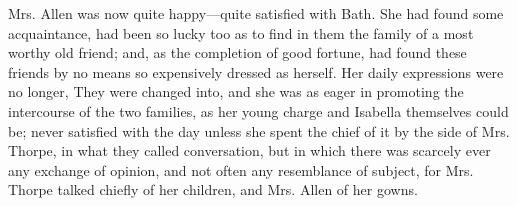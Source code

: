 Mrs. Allen was now quite happy---quite satisfied with Bath. She had found some acquaintance, had been so lucky too as to find in them the family of a most worthy old friend; and, as the completion of good fortune, had found these friends by no means so expensively dressed as herself. Her daily expressions were no longer,  They were changed into,  and she was as eager in promoting the intercourse of the two families, as her young charge and Isabella themselves could be; never satisfied with the day unless she spent the chief of it by the side of Mrs. Thorpe, in what they called conversation, but in which there was scarcely ever any exchange of opinion, and not often any resemblance of subject, for Mrs. Thorpe talked chiefly of her children, and Mrs. Allen of her gowns.

